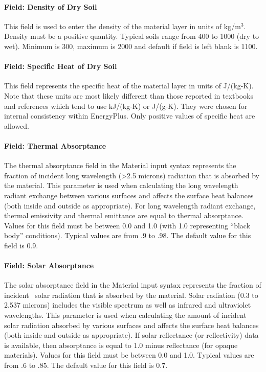 \paragraph{Field: Density of Dry Soil}\label{field-density-of-dry-soil}

This field is used to enter the density of the material layer in units of kg/m\(^{3}\). Density must be a positive quantity. Typical soils range from 400 to 1000 (dry to wet). Minimum is 300, maximum is 2000 and default if field is left blank is 1100.

\paragraph{Field: Specific Heat of Dry Soil}\label{field-specific-heat-of-dry-soil}

This field represents the specific heat of the material layer in units of J/(kg-K). Note that these units are most likely different than those reported in textbooks and references which tend to use kJ/(kg-K) or J/(g-K). They were chosen for internal consistency within EnergyPlus. Only positive values of specific heat are allowed.

\paragraph{Field: Thermal Absorptance}\label{field-thermal-absorptance-2}

The thermal absorptance field in the Material input syntax represents the fraction of incident long wavelength (>2.5 microns) radiation that is absorbed by the material. This parameter is used when calculating the long wavelength radiant exchange between various surfaces and affects the surface heat balances (both inside and outside as appropriate). For long wavelength radiant exchange, thermal emissivity and thermal emittance are equal to thermal absorptance. Values for this field must be between 0.0 and 1.0 (with 1.0 representing ``black body'' conditions). Typical values are from .9 to .98. The default value for this field is 0.9.

\paragraph{Field: Solar Absorptance}\label{field-solar-absorptance-2}

The solar absorptance field in the Material input syntax represents the fraction of incident~ solar radiation that is absorbed by the material. Solar radiation (0.3 to 2.537 microns) includes the visible spectrum as well as infrared and ultraviolet wavelengths. This parameter is used when calculating the amount of incident solar radiation absorbed by various surfaces and affects the surface heat balances (both inside and outside as appropriate). If solar reflectance (or reflectivity) data is available, then absorptance is equal to 1.0 minus reflectance (for opaque materials). Values for this field must be between 0.0 and 1.0. Typical values are from .6 to .85. The default value for this field is 0.7.

